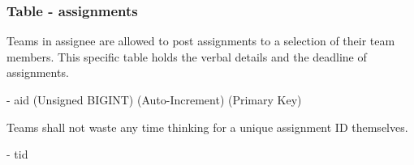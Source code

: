 \documentclass[12pt]{report}
\newcommand{\n}{\par}
\newcommand{\br}{\n\vspace{1 em}\n}
\begin{document}
\subsubsection{Table - assignments} \label{data-layer.design.assignment-system.assignments}
Teams in assignee are allowed to post assignments to a selection of their team members.
This specific table holds the verbal details and the deadline of assignments.
\br
- aid (Unsigned BIGINT) (Auto-Increment) (Primary Key)\n
Teams shall not waste any time thinking for a unique assignment ID themselves.
\br
- tid













\end{document}
